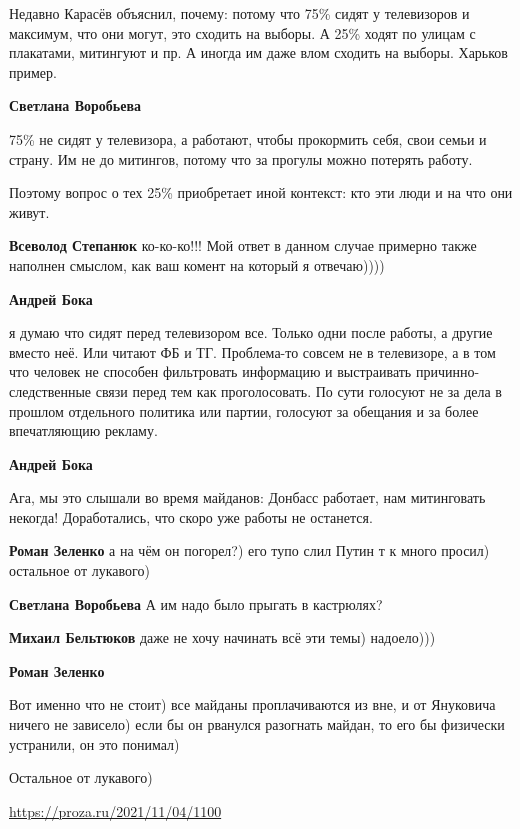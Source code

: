 \begin{itemize}
\begin{itemize}
Недавно Карасёв объяснил, почему: потому что 75\% сидят у телевизоров и
максимум, что они могут, это сходить на выборы. А 25\% ходят по улицам с
плакатами, митингуют и пр. А иногда им даже влом сходить на выборы. Харьков
пример.


\textbf{Светлана Воробьева} 

75\% не сидят у телевизора, а работают, чтобы прокормить себя, свои семьи и
страну. Им не до митингов, потому что за прогулы можно потерять работу.

Поэтому вопрос о тех 25\% приобретает иной контекст: кто эти люди и на что они
живут.

\textbf{Всеволод Степанюк} ко-ко-ко!!!
Мой ответ в данном случае примерно также наполнен смыслом, как ваш комент на который я отвечаю))))

\textbf{Андрей Бока} 

я думаю что сидят перед телевизором все. Только одни после работы, а другие
вместо неё. Или читают ФБ и ТГ. Проблема-то совсем не в телевизоре, а в том что
человек не способен фильтровать информацию и выстраивать причинно-следственные
связи перед тем как проголосовать. По сути голосуют не за дела в прошлом
отдельного политика или партии, голосуют за обещания и за более впечатляющию
рекламу.

\textbf{Андрей Бока} 

Ага, мы это слышали во время майданов: Донбасс работает, нам митинговать
некогда! Доработались, что скоро уже работы не останется.

\textbf{Роман Зеленко} а на чём он погорел?) его тупо слил Путин т к много просил) остальное от лукавого)

\textbf{Светлана Воробьева} А им надо было прыгать в кастрюлях?

\textbf{Михаил Бельтюков} даже не хочу начинать всё эти темы) надоело)))

\textbf{Роман Зеленко} 

Вот именно что не стоит) все майданы проплачиваются из вне, и от Януковича
ничего не зависело) если бы он рванулся разогнать майдан, то его бы физически
устранили, он это понимал)

Остальное от лукавого)
\end{itemize} %

\url{https://proza.ru/2021/11/04/1100}

\end{itemize} %
